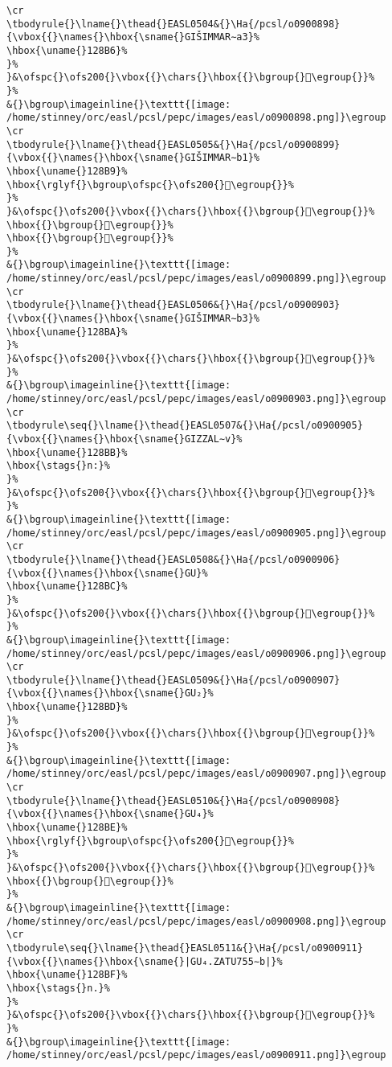 \begin{verbatim}
\cr
\tbodyrule{}\lname{}\thead{}EASL0504&{}\Ha{/pcsl/o0900898}{\vbox{{}\names{}\hbox{\sname{}GIŠIMMAR∼a3}%
\hbox{\uname{}128B6}%
}%
}&\ofspc{}\ofs200{}\vbox{{}\chars{}\hbox{{}\bgroup{}𒢶\egroup{}}%
}%
&{}\bgroup\imageinline{}\texttt{[image: /home/stinney/orc/easl/pcsl/pepc/images/easl/o0900898.png]}\egroup
\cr
\tbodyrule{}\lname{}\thead{}EASL0505&{}\Ha{/pcsl/o0900899}{\vbox{{}\names{}\hbox{\sname{}GIŠIMMAR∼b1}%
\hbox{\uname{}128B9}%
\hbox{\rglyf{}\bgroup\ofspc{}\ofs200{}𒢹\egroup{}}%
}%
}&\ofspc{}\ofs200{}\vbox{{}\chars{}\hbox{{}\bgroup{}𒢷\egroup{}}%
\hbox{{}\bgroup{}𒢸\egroup{}}%
\hbox{{}\bgroup{}𒢹\egroup{}}%
}%
&{}\bgroup\imageinline{}\texttt{[image: /home/stinney/orc/easl/pcsl/pepc/images/easl/o0900899.png]}\egroup
\cr
\tbodyrule{}\lname{}\thead{}EASL0506&{}\Ha{/pcsl/o0900903}{\vbox{{}\names{}\hbox{\sname{}GIŠIMMAR∼b3}%
\hbox{\uname{}128BA}%
}%
}&\ofspc{}\ofs200{}\vbox{{}\chars{}\hbox{{}\bgroup{}𒢺\egroup{}}%
}%
&{}\bgroup\imageinline{}\texttt{[image: /home/stinney/orc/easl/pcsl/pepc/images/easl/o0900903.png]}\egroup
\cr
\tbodyrule\seq{}\lname{}\thead{}EASL0507&{}\Ha{/pcsl/o0900905}{\vbox{{}\names{}\hbox{\sname{}GIZZAL∼v}%
\hbox{\uname{}128BB}%
\hbox{\stags{}n:}%
}%
}&\ofspc{}\ofs200{}\vbox{{}\chars{}\hbox{{}\bgroup{}𒢻\egroup{}}%
}%
&{}\bgroup\imageinline{}\texttt{[image: /home/stinney/orc/easl/pcsl/pepc/images/easl/o0900905.png]}\egroup
\cr
\tbodyrule{}\lname{}\thead{}EASL0508&{}\Ha{/pcsl/o0900906}{\vbox{{}\names{}\hbox{\sname{}GU}%
\hbox{\uname{}128BC}%
}%
}&\ofspc{}\ofs200{}\vbox{{}\chars{}\hbox{{}\bgroup{}𒢼\egroup{}}%
}%
&{}\bgroup\imageinline{}\texttt{[image: /home/stinney/orc/easl/pcsl/pepc/images/easl/o0900906.png]}\egroup
\cr
\tbodyrule{}\lname{}\thead{}EASL0509&{}\Ha{/pcsl/o0900907}{\vbox{{}\names{}\hbox{\sname{}GU₂}%
\hbox{\uname{}128BD}%
}%
}&\ofspc{}\ofs200{}\vbox{{}\chars{}\hbox{{}\bgroup{}𒢽\egroup{}}%
}%
&{}\bgroup\imageinline{}\texttt{[image: /home/stinney/orc/easl/pcsl/pepc/images/easl/o0900907.png]}\egroup
\cr
\tbodyrule{}\lname{}\thead{}EASL0510&{}\Ha{/pcsl/o0900908}{\vbox{{}\names{}\hbox{\sname{}GU₄}%
\hbox{\uname{}128BE}%
\hbox{\rglyf{}\bgroup\ofspc{}\ofs200{}𒢾\egroup{}}%
}%
}&\ofspc{}\ofs200{}\vbox{{}\chars{}\hbox{{}\bgroup{}𒣁\egroup{}}%
\hbox{{}\bgroup{}𒢾\egroup{}}%
}%
&{}\bgroup\imageinline{}\texttt{[image: /home/stinney/orc/easl/pcsl/pepc/images/easl/o0900908.png]}\egroup
\cr
\tbodyrule\seq{}\lname{}\thead{}EASL0511&{}\Ha{/pcsl/o0900911}{\vbox{{}\names{}\hbox{\sname{}|GU₄.ZATU755∼b|}%
\hbox{\uname{}128BF}%
\hbox{\stags{}n.}%
}%
}&\ofspc{}\ofs200{}\vbox{{}\chars{}\hbox{{}\bgroup{}𒢿\egroup{}}%
}%
&{}\bgroup\imageinline{}\texttt{[image: /home/stinney/orc/easl/pcsl/pepc/images/easl/o0900911.png]}\egroup

\end{verbatim}

